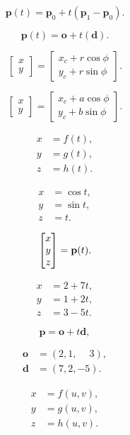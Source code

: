 \documentclass[lang=cn,12pt]{elegantbook}
\begin{document}
$$
  \mathbf{p}(t)=\mathbf{p}_{0}+t(\mathbf{p}_{1}-\mathbf{p}_{0}).
$$

$$
  \mathbf{p}(t)=\mathbf{o}+t(\mathbf{d}).
$$

$$
  \begin{bmatrix}
    x \\
    y
  \end{bmatrix}=
  \begin{bmatrix}
    x_c+r\cos\phi \\
    y_c+r\sin\phi
  \end{bmatrix}.
$$

$$
  \begin{bmatrix}
    x \\
    y
  \end{bmatrix}=
  \begin{bmatrix}
    x_c+a\cos\phi \\
    y_c+b\sin\phi
  \end{bmatrix}.
$$

$$
  \begin{aligned}
    x & =f(t), \\
    y & =g(t), \\
    z & =h(t).
  \end{aligned}
$$

$$
  \begin{aligned}
    x & =\cos t, \\
    y & =\sin t, \\
    z & =t.
  \end{aligned}
$$

$$
  \begin{bmatrix}
    x \\
    y \\
    z
  \end{bmatrix}={\bf p}(t).
$$

$$
  \begin{aligned}
    x & =2+7t, \\
    y & =1+2t, \\
    z & =3-5t.
  \end{aligned}
$$

$$
  \mathbf{p}=\mathbf{o}+t\mathbf{d},
$$

$$
  \begin{aligned}
    \mathbf{o} & =(2,1,\phantom{-}3), \\
    \mathbf{d} & =(7,2,-5).
  \end{aligned}
$$

$$
  \begin{aligned}
    x & =f(u,v), \\
    y & =g(u,v), \\
    z & =h(u,v).
  \end{aligned}
$$
\end{document}
